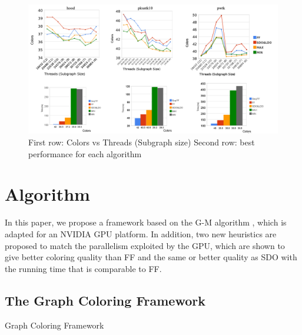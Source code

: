 \documentclass[preprint]{sigplanconf}
\newcommand{\gm}{G-M\xspace}
\begin{document}
\begin{figure}[t]
  \centering
  \includegraphics[scale=0.28]{figures/newPlot.png}
  \caption{ First row: Colors vs Threads (Subgraph size)  Second row: best performance for each algorithm}
  \label{fig:results}
\end{figure}


\section{Algorithm}

In this paper, we propose a framework based on the \gm algorithm \cite{gebremedhin2000scalable}, which is adapted for an NVIDIA GPU platform.  In addition, two new heuristics are proposed to match the parallelism exploited by the GPU, which are shown to give better coloring quality than FF and  the same or better quality as SDO with the running time that is comparable to FF. 

\subsection{The Graph Coloring Framework}

\renewcommand{\algorithmicrequire}{\textbf{Phase}}
\begin{algorithm}
\caption{Graph Coloring Framework \label{alg:framework}}
\begin{algorithmic}
\newline
	
		\newline
	\ENDWHILE
	

		
\end{algorithmic}
\end{algorithm}
\end{document}
